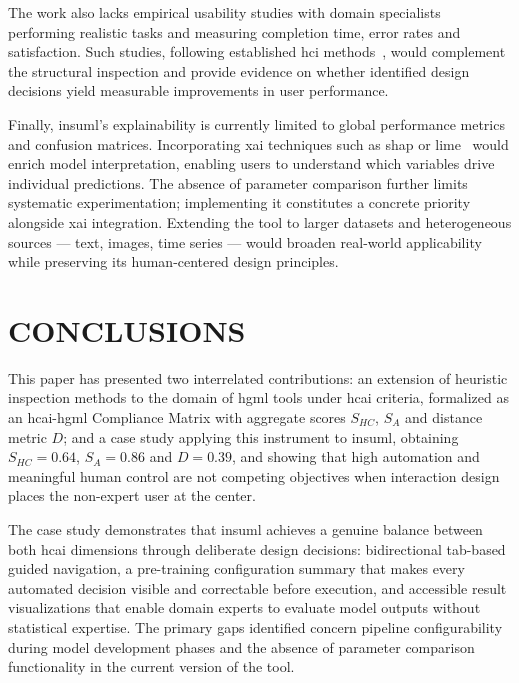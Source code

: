 \documentclass[a4paper,twoside]{article}
\begin{document}
The work also lacks empirical usability studies with domain specialists
performing realistic tasks and measuring completion time, error rates and
satisfaction. Such studies, following established \gls{hci}
methods~\cite{lazar2017research}, would complement the structural inspection
and provide evidence on whether identified design decisions yield measurable
improvements in user performance.

Finally, \gls{insuml}'s explainability is currently limited to global
performance metrics and confusion matrices. Incorporating \gls{xai}
techniques such as \gls{shap} or \gls{lime}~\cite{salih2025perspective}
would enrich model interpretation, enabling users to understand which
variables drive individual predictions. The absence of parameter comparison
further limits systematic experimentation; implementing it constitutes a
concrete priority alongside \gls{xai} integration. Extending the tool to
larger datasets and heterogeneous sources --- text, images, time series ---
would broaden real-world applicability while preserving its human-centered
design principles.
  
  
\section{\uppercase{Conclusions}}  
\label{sec:conclusions}  
  
This paper has presented two interrelated contributions: an extension of    
heuristic inspection methods to the domain of \gls{hgml} tools under    
\gls{hcai} criteria, formalized as an \gls{hcai}-\gls{hgml} Compliance    
Matrix with aggregate scores $S_{HC}$, $S_{A}$ and distance metric $D$;    
and a case study applying this instrument to \gls{insuml}, obtaining    
$S_{HC} = 0.64$, $S_{A} = 0.86$ and $D = 0.39$, and showing that    
high automation and meaningful human control are not competing objectives    
when interaction design places the non-expert user at the center.  
  
The case study demonstrates that \gls{insuml} achieves a genuine balance  
between both \gls{hcai} dimensions through deliberate design decisions:  
bidirectional tab-based guided navigation, a pre-training configuration  
summary that makes every automated decision visible and correctable before  
execution, and accessible result visualizations that enable domain experts  
to evaluate model outputs without statistical expertise. The primary gaps  
identified concern pipeline configurability during model development  
phases and the absence of parameter comparison functionality in the  
current version of the tool.
  
\end{document}
